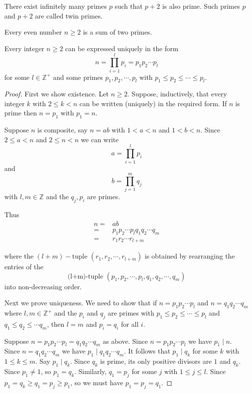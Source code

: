 \begin{conj}
    There exist infinitely many primes $p$ such that $p+2$ is also prime. Such primes $p$ and $p+2$ are called twin primes.
\end{conj}

\begin{conj}
    Every even number $n\geq 2$ is a sum of two primes.
\end{conj}


\begin{thm}
    Every integer $n\geq 2$ can be expressed uniquely in the form \[n=\prod_{i=1}^l p_i = p_1p_2\cdots p_l\] for some $l\in\mathbb{Z}^+$ and some primes $p_1,p_2,\cdots,p_l$ with $p_1\leq p_2\leq \cdots \leq p_l$.
\end{thm}

\begin{proof}
    First we show existence. Let $n\geq 2$. Suppose, inductively, that every integer $k$ with $2\leq k < n$ can be written (uniquely) in the required form. If $n$ is prime then $n = p_1$ with $p_1 = n$.
    
    Suppose $n$ is composite, say $n=ab$ with $1<a<n$ and $1<b<n$. Since $2\leq a < n$ and $2\leq n < n$ we can write \[a = \prod_{i=1}^l p_i\] and \[b = \prod_{j=1}^m q_j\] with $l,m\in\mathbb{Z}$ and the $q_j,p_i$ are primes.
    
    Thus \begin{align*}
        n = & ab \\
        = & p_1p_2\cdots p_lq_1q_2\cdots q_m\\
        = & r_1r_2\cdots r_{l+m}
    \end{align*}
    
    where the $(l+m)-$tuple $(r_1,r_2,\cdots ,r_{l+m})$ is obtained by rearranging the entries of the \[\text{(l+m)-tuple } (p_1,p_2,\cdots ,p_{l},q_1,q_2,\cdots ,q_{m})\] into non-decreasing order.
    
    Next we prove uniqueness. We need to show that if $n=p_1p_2\cdots p_l$ and $n=q_1q_2\cdots q_m$ where $l,m\in\mathbb{Z}^+$ and the $p_i$ and $q_j$ are primes with $p_1\leq p_2 \leq \cdots \leq p_l$ and $q_1\leq q_2\leq \cdots q_m$, then $l=m$ and $p_i=q_i$ for all $i$.
    
    Suppose $n=p_1p_2\cdots p_l=q_1q_2\cdots q_m$ as above. Since $n=p_1p_2\cdots p_l$ we have $p_1\mid n$. Since $n=q_1q_2\cdots q_m$ we have $p_1\mid q_1q_2\cdots q_m$. It follows that $p_1\mid q_k$ for some $k$ with $1\leq k\leq m$. Say $p_1\mid q_k$. Since $q_k$ is prime, its only positive divisors are $1$ and $q_k$. Since $p_1\neq 1$, so $p_1 = q_k$. Similarly, $q_1 = p_j$ for some $j$ with $1\leq j\leq l$. Since $p_1 = q_k \geq q_1 = p_j \geq p_1$, so we must have $p_1=p_j=q_1$.
\end{proof}